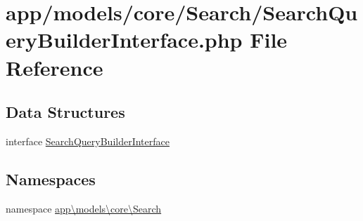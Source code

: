 \hypertarget{_search_query_builder_interface_8php}{\section{app/models/core/\-Search/\-Search\-Query\-Builder\-Interface.php File Reference}
\label{_search_query_builder_interface_8php}
}
\subsection*{Data Structures}
\begin{DoxyCompactItemize}
\item 
interface \hyperlink{interfaceapp_1_1models_1_1core_1_1_search_1_1_search_query_builder_interface}{Search\-Query\-Builder\-Interface}
\end{DoxyCompactItemize}
\subsection*{Namespaces}
\begin{DoxyCompactItemize}
\item 
namespace \hyperlink{namespaceapp_1_1models_1_1core_1_1_search}{app\textbackslash{}models\textbackslash{}core\textbackslash{}\-Search}
\end{DoxyCompactItemize}
